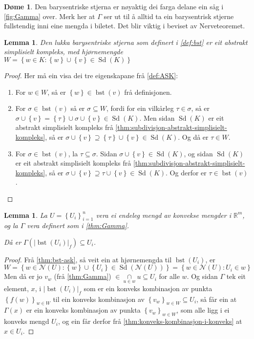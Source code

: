 \documentclass[a4paper, 12pt, norsk]{article}
\theoremstyle{plain}
\newtheorem{lemma}[theorem]{Lemma}
\theoremstyle{definition}
\newtheorem{example}[theorem]{Døme}
\newcommand{\Rb}{\mathbb{R}}
\newcommand{\Nc}{\mathcal{N}}
\newcommand{\intersect}{ \mathop{\cap}\limits }
\newcommand{\union}{ \mathop{\cup}\limits }
\newcommand{\gr}[1]{ \lvert #1 \rvert } %
\newcommand{\set}[1]{ \left\{ #1 \right\} } %
\DeclareMathOperator{\Sd}{Sd} %
\DeclareMathOperator{\bst}{bst} %
\begin{document}
\begin{example}
	Den barysentriske stjerna er nøyaktig dei farga delane ein såg i \autoref{fig:Gamma} over. Merk her at \( \Gamma \) ser ut til å alltid ta ein barysentrisk stjerne fullstendig inni eine mengda i biletet. Det blir viktig i beviset av Nerveteoremet.
\end{example}

\begin{lemma} \label{thm:bst-ask}
	Den lukka barysentriske stjerna som definert i \autoref{def:bst} er eit abstrakt simplisielt kompleks, med hjørnemengde \( W = \set{w \in K : \set{w} \union \set{v} \in \Sd(K)} \)
\end{lemma}

\begin{proof}
	Her må ein visa dei tre eigenskapane frå \autoref{def:ASK}:
	\begin{enumerate}
		\item{For \( w \in W \), så er \( \set{w} \in \bst(v) \) frå definisjonen.}
  		\item{For \( \sigma \in \bst(v) \) så er \( \sigma \subseteq W \), fordi for ein vilkårleg \( \tau \in \sigma \), så er \( \sigma \union \set{v} = \set{\tau} \union \sigma \union \set{v} \in \Sd(K) \). Men sidan \( \Sd(K) \) er eit abstrakt simplisielt kompleks frå \autoref{thm:subdivisjon-abstrakt-simplisielt-kompleks}, så er \( \sigma \union \set{v} \supseteq \set{\tau} \union \set{v} \in \Sd(K) \). Og då er \( \tau \in W \).}
    	\item{For \( \sigma \in \bst(v) \), la \( \tau \subseteq \sigma \). Sidan \( \sigma \union \set{v} \in \Sd(K) \), og sidan \( \Sd(K) \) er eit abstrakt simplisielt kompleks frå \autoref{thm:subdivisjon-abstrakt-simplisielt-kompleks}, så er \( \sigma \union \set{v} \supseteq \tau \union \set{v} \in \Sd(K) \). Og derfor er \( \tau \in \bst(v) \).}
	\end{enumerate}
\end{proof}

\begin{lemma} \label{thm:Gamma-inni-ui}
	La \( U = \set{U_i}_{i=1}^n \) vera ei endeleg mengd av konvekse mengder i \( \Rb^m \), og la \( \Gamma \) vera definert som i \autoref{thm:Gamma}.

	Då er \( \Gamma(\gr{\bst(U_i)}_f) \subseteq U_i \).
\end{lemma}

\begin{proof}
	Frå \autoref{thm:bst-ask}, så veit ein at hjørnemengda til \( \bst(U_i) \), er
	\[
		W = \set{w \in \Nc(U) : \set{w} \union \set{U_i} \in \Sd(\Nc(U))}=\set{w \in \Nc(U) : U_i \in w}
	\] 
	Men då er jo \( v_w \) (frå \autoref{thm:Gamma}) \( \in \intersect_{u \in w} u \subseteq U_i \) for alle \( w \). Og sidan \( \Gamma \) tek eit element, \( x \), i \( \gr{\bst(U_i)}_f \) som er ein konveks kombinasjon av punkta \( \set{f(w)}_{w \in W} \) til ein konveks kombinasjon av \( \set{v_w}_{w \in W} \subseteq U_i \), så får ein at \( \Gamma(x) \) er ein konveks kombinasjon av punkta \( \set{v_w}_{w \in W} \), som alle ligg i ei konveks mengd \( U_i \), og ein får derfor frå \autoref{thm:konveks-kombinasjon-i-konveks} at \( x \in U_i \).
\end{proof}
\end{document}
